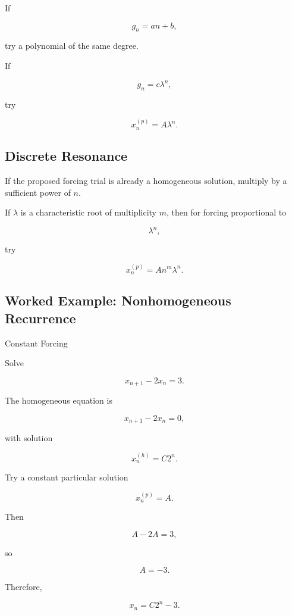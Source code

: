 If

\[
g_n=an+b,
\]

try a polynomial of the same degree.

If

\[
g_n=c\lambda^n,
\]

try

\[
\boxed{
x_n^{(p)}=A\lambda^n.
}
\]

\subsection{Discrete Resonance}
\label{subsec:discrete-resonance}

If the proposed forcing trial is already a homogeneous solution, multiply
by a sufficient power of \(n\).

If \(\lambda\) is a characteristic root of multiplicity \(m\), then for
forcing proportional to

\[
\lambda^n,
\]

try

\[
\boxed{
x_n^{(p)}
=
An^m\lambda^n.
}
\]

\subsection{Worked Example: Nonhomogeneous Recurrence}
\label{subsec:worked-nonhomogeneous-recurrence}

\begin{workedexamplebox}{Constant Forcing}

Solve

\[
x_{n+1}
-
2x_n
=
3.
\]

The homogeneous equation is

\[
x_{n+1}-2x_n=0,
\]

with solution

\[
x_n^{(h)}
=
C2^n.
\]

Try a constant particular solution

\[
x_n^{(p)}=A.
\]

Then

\[
A-2A=3,
\]

so

\[
A=-3.
\]

Therefore,

\begin{answerbox}
\[
\boxed{
x_n
=
C2^n-3.
}
\]
\end{answerbox}

\end{workedexamplebox}


